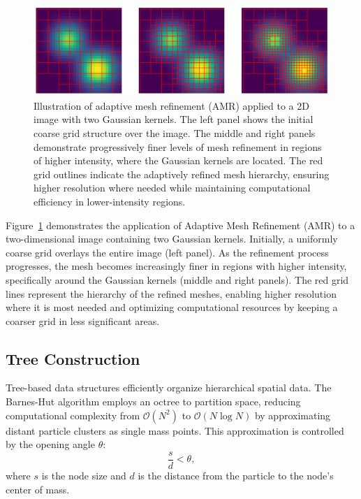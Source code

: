 \begin{figure}
    \centering
    \includegraphics[width=\textwidth]{figures/adaptive_mesh_refinement.png}
    \caption[Illustration of adaptive mesh refinement]{Illustration of adaptive mesh refinement (AMR) applied to a 2D image with two Gaussian kernels. The left panel shows the initial coarse grid structure over the image. The middle and right panels demonstrate progressively finer levels of mesh refinement in regions of higher intensity, where the Gaussian kernels are located. The red grid outlines indicate the adaptively refined mesh hierarchy, ensuring higher resolution where needed while maintaining computational efficiency in lower-intensity regions.}
    \label{fig:amr}
\end{figure}
Figure~\ref{fig:amr} demonstrates the application of Adaptive Mesh Refinement (AMR) to a two-dimensional image containing two Gaussian kernels. Initially, a uniformly coarse grid overlays the entire image (left panel). As the refinement process progresses, the mesh becomes increasingly finer in regions with higher intensity, specifically around the Gaussian kernels (middle and right panels). The red grid lines represent the hierarchy of the refined meshes, enabling higher resolution where it is most needed and optimizing computational resources by keeping a coarser grid in less significant areas.

\subsection{Tree Construction}
Tree-based data structures efficiently organize hierarchical spatial data. The Barnes-Hut algorithm employs an octree to partition space, reducing computational complexity from $\mathcal{O}(N^2)$ to $\mathcal{O}(N \log N)$ by approximating distant particle clusters as single mass points. This approximation is controlled by the opening angle $\theta$:
\begin{equation}
    \frac{s}{d} < \theta,
\end{equation}
where $s$ is the node size and $d$ is the distance from the particle to the node's center of mass.

